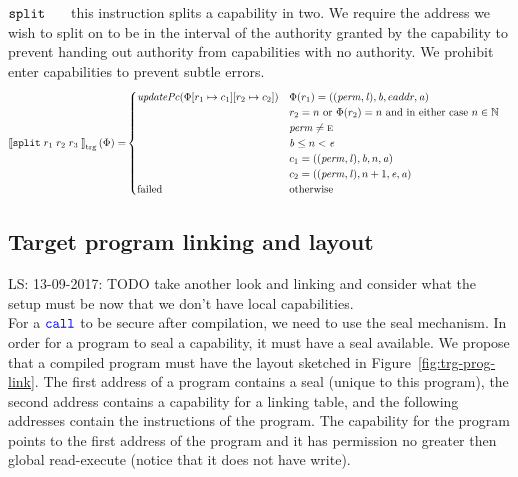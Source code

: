 \documentclass[a4paper]{article}
\newcommand\lau[1]{{\color{purple} \sf \footnotesize {LS: #1}}\\}
\newcommand{\sem}[1]{\left\llbracket #1 \right\rrbracket}
\newcommand{\tsem}[2][\Phi]{\sem{#2}_{\mathrm{trg}}(#1)}
\newcommand{\totherwise}{\text{otherwise }}
\newcommand{\sourcecolor}[1]{\color{blue}}
\newcommand{\src}[1]{{\sourcecolor{} #1}}
\newcommand{\targetcolor}[1]{\color{black}}
\newcommand{\trg}[1]{{\targetcolor{} #1}}
\newcommand{\zinstr}[1]{\texttt{#1}}
\newcommand{\twoinstr}[3]{
  \ifthenelse{\equal{#2#3}{}}
  {\zinstr{#1}}
  {\zinstr{#1} \; #2 \; #3}
}
\newcommand{\fourinstr}[5]{
  \ifthenelse{\equal{#2#3#4#5}{}}
  {\zinstr{#1}}
  {\zinstr{#1} \; #2 \; #3 \; #4 \; #5}
}
\newcommand{\scall}[2]{\twoinstr{\src{call}}{#1}{#2}}
\newcommand{\tsplit}[4]{\fourinstr{\trg{split}}{#1}{#2}{#3}{#4}}
\newcommand{\nats}{\mathbb{N}}
\newcommand{\update}[2]{[#1 \mapsto #2]}
\newcommand{\perm}{\var{perm}}
\newcommand{\lin}{\var{l}}
\newcommand{\failed}{\mathrm{failed}}
\newcommand{\var}[1]{\mathit{#1}}
\newcommand{\baddr}{\var{b}}
\newcommand{\eaddr}{\var{e}}
\newcommand{\aaddr}{\var{a}}
\newcommand{\plainperm}[1]{\textsc{#1}}
\newcommand{\enter}{\plainperm{e}}
\newcommand{\plainfun}[2]{
  \ifthenelse{\equal{#2}{}}
  {\mathit{#1}}
  {\mathit{#1}(#2)}
}
\newcommand{\updPcAddr}[1]{\plainfun{updatePc}{#1}}
\begin{document}
$\tsplit{}{}{}$ this instruction splits a capability in two. We require the address we wish to split on to be in the interval of the authority granted by the capability to prevent handing out authority from capabilities with no authority. We prohibit enter capabilities to prevent subtle errors. 
\begin{align*}
  \tsem{\tsplit{r_1}{r_2}{r_3}} = &
                               \begin{cases}
                                 \updPcAddr{\Phi\update{r_1}{c_1}\update{r_2}{c_2}} &
                                 \arraycolsep=0pt
                                 \begin{array}[t]{l}
                                   \Phi(r_1) = ((\perm, \lin), \baddr, eaddr, \aaddr) \\
                                   r_2 = n \text{ or } \Phi(r_2) = n \text{ and in either case } n \in \nats\\
                                   \perm \neq \enter\\
                                   \baddr \leq n  < \eaddr\\
                                   c_1 = ((\perm,\lin),\baddr, n, \aaddr) \\
                                   c_2 = ((\perm,\lin),n + 1, \eaddr,\aaddr)
                                 \end{array} \\
                                 \failed & \totherwise
                               \end{cases}
\end{align*}


\subsection{Target program linking and layout}
\lau{13-09-2017: TODO take another look and linking and consider what the setup must be now that we don't have local capabilities.}
For a $\scall{}{}$ to be secure after compilation, we need to use the seal mechanism. In order for a program to seal a capability, it must have a seal available. We propose that a compiled program must have the layout sketched in Figure~\ref{fig:trg-prog-link}. The first address of a program contains a seal (unique to this program), the second address contains a capability for a linking table, and the following addresses contain the instructions of the program. The capability for the program points to the first address of the program and it has permission no greater then global read-execute (notice that it does not have write).
\end{document}
